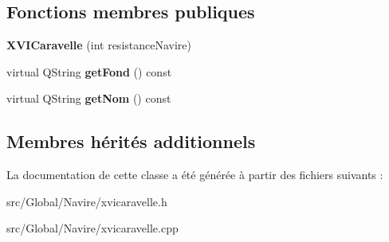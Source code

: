 \subsection*{Fonctions membres publiques}
\begin{DoxyCompactItemize}
\item 
{\bfseries X\+V\+I\+Caravelle} (int resistance\+Navire)\hypertarget{class_x_v_i_caravelle_a2316f9e79810594371fffe5d0dcb57b3}{}\label{class_x_v_i_caravelle_a2316f9e79810594371fffe5d0dcb57b3}

\item 
virtual Q\+String {\bfseries get\+Fond} () const \hypertarget{class_x_v_i_caravelle_a4c710186bc9a01b541528d12840dc8f1}{}\label{class_x_v_i_caravelle_a4c710186bc9a01b541528d12840dc8f1}

\item 
virtual Q\+String {\bfseries get\+Nom} () const \hypertarget{class_x_v_i_caravelle_af26fba914a34f8eca6191b0d6aebe9fa}{}\label{class_x_v_i_caravelle_af26fba914a34f8eca6191b0d6aebe9fa}

\end{DoxyCompactItemize}
\subsection*{Membres hérités additionnels}


La documentation de cette classe a été générée à partir des fichiers suivants \+:\begin{DoxyCompactItemize}
\item 
src/\+Global/\+Navire/xvicaravelle.\+h\item 
src/\+Global/\+Navire/xvicaravelle.\+cpp\end{DoxyCompactItemize}
